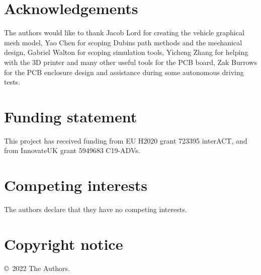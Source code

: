 \documentclass[a4paper]{article}
\begin{document}
	
	\section*{Acknowledgements}\label{h.gu3yyarx72d6}
	
	The authors would like to thank Jacob Lord for creating the vehicle graphical mesh model, Yao Chen for scoping Dubins path methods and the mechanical design, Gabriel Walton for scoping simulation tools, Yicheng Zhang for helping with the 3D printer and many other useful tools for the PCB board, Zak Burrows for the PCB enclosure design and assistance during some autonomous driving tests.
	
	
	\section*{Funding statement}\label{h.4u1a7tugh2om}
	
	This project has received funding from EU H2020 grant 723395 interACT, and from InnovateUK  grant 5949683 C19-ADVs.
	
	
	\section*{Competing interests}\label{h.q1j1rznb43fl}
	
	The authors declare that they have no competing interests.
	
	
	
	
	
	\section*{Copyright notice}\label{h.jm5gcqv4g8x0}
	
	\copyright~2022 The Authors. %
	
	
	
\end{document}
